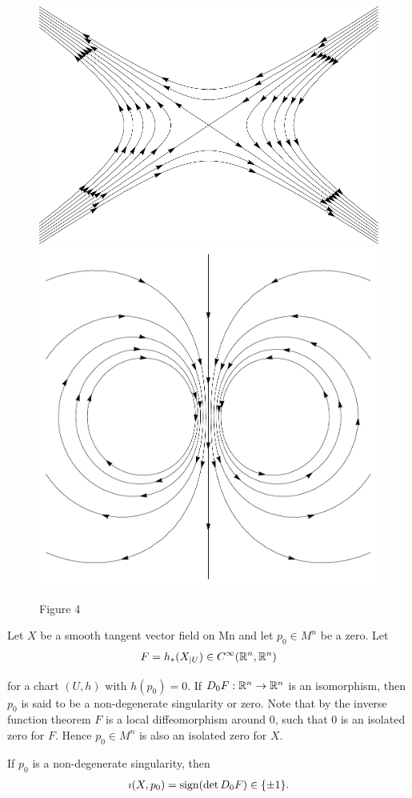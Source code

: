 \begin{figure}[!htb]
  \centering
  \includegraphics[width=.4\linewidth]{./pics/chap11-4-I.pdf}\quad
  \includegraphics[width=.4\linewidth]{./pics/chap11-4-II.pdf}
  \caption{Figure 4}
  \label{fig:11-4}
\end{figure}

Let $X$ be a smooth tangent vector field on Mn and let $p_0\in M^n$ be a zero. Let
\begin{align*}
  F = h_*(X_{|U})\in C^\infty(\mathbb{R}^n, \mathbb{R}^n)
\end{align*}

for a chart $(U, h)$ with $h(p_0) = 0$. If $D_0F:\mathbb{R}^n\to\mathbb{R}^n$ is an isomorphism, then
$p_0$ is said to be a non-degenerate singularity or zero. Note that by the inverse
function theorem $F$ is a local diffeomorphism around 0, such that 0 is an isolated
zero for $F$. Hence $p_0\in M^n$ is also an isolated zero for $X$.

\begin{lemma}\label{lemma:11-20}
  If $p_0$ is a non-degenerate singularity, then
  \begin{align*}
    \imath(X, p_0) = \mathrm{sign}(\det D_0F)\in \{\pm 1\}.
  \end{align*}
\end{lemma}

